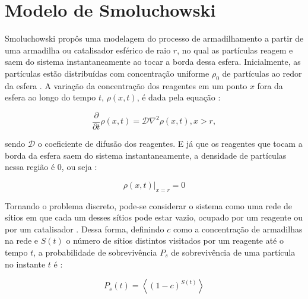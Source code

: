
\section{Modelo de Smoluchowski}

Smoluchowski propôs uma modelagem do processo de armadilhamento a partir de uma
armadilha ou catalisador esférico de raio $r$, no qual as partículas reagem e saem
do sistema instantaneamente ao tocar a borda dessa esfera. Inicialmente, as
partículas estão distribuídas com concentração uniforme $\rho_0$ de partículas
ao redor da esfera \cite{3}. A variação da concentração dos reagentes em um
ponto $x$ fora da esfera ao longo do tempo $t$, $\rho(x,t)$, é dada pela
equação \cite{3}:

{
\setlength{\belowdisplayskip}{0pt} \setlength{\belowdisplayshortskip}{0pt}
\setlength{\abovedisplayskip}{0pt} \setlength{\abovedisplayshortskip}{0pt}

\begin{equation}
  \dfrac{\partial}{\partial t}\rho(x,t) = \mathcal{D}\nabla^2\rho(x,t), x>r,
  \label{Equation-021}
\end{equation}
}

\noindent sendo $\mathcal{D}$ o coeficiente de difusão dos reagentes. E já que os
reagentes que tocam a borda da esfera saem do sistema instantaneamente, a
densidade de partículas nessa região é 0, ou seja \cite{3}:

{
\setlength{\belowdisplayskip}{0pt} \setlength{\belowdisplayshortskip}{0pt}
\setlength{\abovedisplayskip}{0pt} \setlength{\abovedisplayshortskip}{0pt}

\begin{equation}
  \rho(x,t)|_{x=r} = 0
  \label{Equation-022}
\end{equation}
}

Tornando o problema discreto, pode-se considerar o sistema como uma rede de
sítios em que cada um desses sítios pode estar vazio, ocupado por um reagente
ou por um catalisador \cite{3}.  Dessa forma, definindo $c$ como a concentração de
armadilhas na rede e $S(t)$ o número de sítios distintos visitados por um reagente
até o tempo $t$, a probabilidade de sobrevivência $P_s$ de sobrevivência de uma
partícula no instante $t$ é \cite{6}:

{
\setlength{\belowdisplayskip}{0pt} \setlength{\belowdisplayshortskip}{0pt}
\setlength{\abovedisplayskip}{0pt} \setlength{\abovedisplayshortskip}{0pt}

\begin{equation}
  P_s(t) = \left<(1-c)^{S(t)}\right>
  \label{Equation-023-Probabilidade}
\end{equation}
}

